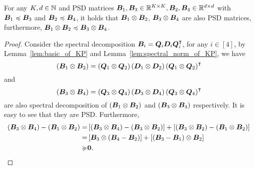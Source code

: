 \begin{lemma}\label{lem:spectra_of_PSD_KP}
For any $K, d\in{\mathbb N}$ and PSD matrices ${\bm{B}}_1, {\bm{B}}_3\in{\mathbb R}^{K\times K}, {\bm{B}}_2, {\bm{B}}_4\in{\mathbb R}^{d\times d}$ with ${\bm{B}}_1\preccurlyeq {\bm{B}}_3$ and ${\bm{B}}_2\preccurlyeq {\bm{B}}_4$, it holds that ${\bm{B}}_1 \otimes {\bm{B}}_2$, ${\bm{B}}_3 \otimes {\bm{B}}_4$ are also PSD matrices, furthermore,
${\bm{B}}_1 \otimes {\bm{B}}_2 \preccurlyeq {\bm{B}}_3 \otimes {\bm{B}}_4$.
\begin{proof}
Consider the spectral decomposition ${\bm{B}}_i={\bm{Q}}_i{\bm{D}}_i{\bm{Q}}_i^{\intercal}$, for any $i\in [4]$, by Lemma~\ref{lem:basic_of_KP} and Lemma~\ref{lem:spectral_norm_of_KP}, we have
\begin{equation*}
    \left({{\bm{B}}_1\otimes {\bm{B}}_2}\right)=\left({{\bm{Q}}_1\otimes {\bm{Q}}_2}\right)\left({{\bm{D}}_1\otimes {\bm{D}}_2}\right)\left({{\bm{Q}}_1\otimes {\bm{Q}}_2}\right)^{\intercal}
\end{equation*}
and 
\begin{equation*}
    \left({{\bm{B}}_3\otimes {\bm{B}}_4}\right)=\left({{\bm{Q}}_3\otimes {\bm{Q}}_4}\right)\left({{\bm{D}}_3\otimes {\bm{D}}_4}\right)\left({{\bm{Q}}_3\otimes {\bm{Q}}_4}\right)^{\intercal}
\end{equation*}
are also spectral decomposition of $\left({{\bm{B}}_1\otimes {\bm{B}}_2}\right)$ and $\left({{\bm{B}}_3\otimes {\bm{B}}_4}\right)$ respectively.
It is easy to see that they are PSD.
Furthermore,
\begin{equation*}
\begin{aligned}
     \left({{\bm{B}}_3\otimes {\bm{B}}_4}\right)-\left({{\bm{B}}_1\otimes {\bm{B}}_2}\right)=&\left[{\left({{\bm{B}}_3\otimes {\bm{B}}_4}\right)-\left({{\bm{B}}_3\otimes {\bm{B}}_2}\right)}\right]+\left[{\left({{\bm{B}}_3\otimes {\bm{B}}_2}\right)-\left({{\bm{B}}_1\otimes {\bm{B}}_2}\right)}\right]  \\
     =&\left[{{\bm{B}}_3\otimes\left({ {\bm{B}}_4-{\bm{B}}_2}\right)}\right]+\left[{\left({{\bm{B}}_3-{\bm{B}}_1}\right)\otimes {\bm{B}}_2}\right] \\
     \succcurlyeq& \bm{0}.
\end{aligned}
\end{equation*}
\end{proof}
\end{lemma}



